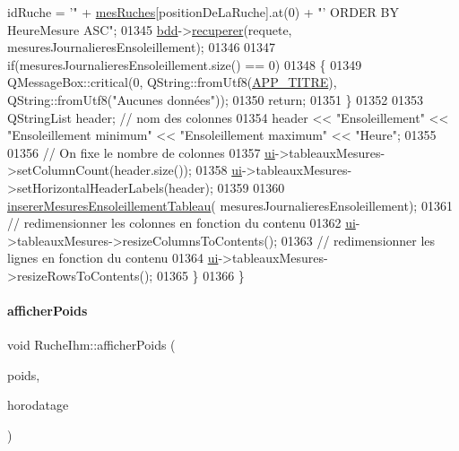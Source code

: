 \begin{DoxyCode}
{       idRuche = '"} + \hyperlink{class_ruche_ihm_ab7741fa67b19cbb2da7eb12c58cf83c1}{mesRuches}[positionDeLaRuche].at(0) + \textcolor{stringliteral}{"' ORDER BY HeureMesure ASC"};
01345         \hyperlink{class_ruche_ihm_a0851936fe212e8d40538264f09749153}{bdd}->\hyperlink{class_base_de_donnees_a77539baad389f5acf754cd2cd452403e}{recuperer}(requete, mesuresJournalieresEnsoleillement);
01346 
01347         \textcolor{keywordflow}{if}(mesuresJournalieresEnsoleillement.size() == 0)
01348         \{
01349             QMessageBox::critical(0, QString::fromUtf8(\hyperlink{parametres_8h_ace364d1ce44aa9f79bcff6e3752c4a5f}{APP\_TITRE}), QString::fromUtf8(\textcolor{stringliteral}{"Aucunes
       données"}));
01350             \textcolor{keywordflow}{return};
01351         \}
01352 
01353         QStringList header; \textcolor{comment}{// nom des colonnes}
01354         header << \textcolor{stringliteral}{"Ensoleillement"} << \textcolor{stringliteral}{"Ensoleillement minimum"} << \textcolor{stringliteral}{"Ensoleillement maximum"} << \textcolor{stringliteral}{"Heure"};
01355 
01356         \textcolor{comment}{// On fixe le nombre de colonnes}
01357         \hyperlink{class_ruche_ihm_a64786058bd7f88ca2f1e9743bb27c25b}{ui}->tableauxMesures->setColumnCount(header.size());
01358         \hyperlink{class_ruche_ihm_a64786058bd7f88ca2f1e9743bb27c25b}{ui}->tableauxMesures->setHorizontalHeaderLabels(header);
01359 
01360         \hyperlink{class_ruche_ihm_a6830ca55859cc2899ae8eb51b112557b}{insererMesuresEnsoleillementTableau}(
      mesuresJournalieresEnsoleillement);
01361         \textcolor{comment}{// redimensionner les colonnes en fonction du contenu}
01362         \hyperlink{class_ruche_ihm_a64786058bd7f88ca2f1e9743bb27c25b}{ui}->tableauxMesures->resizeColumnsToContents();
01363         \textcolor{comment}{// redimensionner les lignes en fonction du contenu}
01364         \hyperlink{class_ruche_ihm_a64786058bd7f88ca2f1e9743bb27c25b}{ui}->tableauxMesures->resizeRowsToContents();
01365     \}
01366 \}
\end{DoxyCode}
\mbox{\label{class_ruche_ihm_a840ab51f951632e630f92e6c0b5ecc4d}} 
\paragraph{\texorpdfstring{afficher\+Poids}{afficherPoids}}
{\footnotesize\ttfamily void Ruche\+Ihm\+::afficher\+Poids (\begin{DoxyParamCaption}\item[{double}]{poids,  }\item[{Q\+String}]{horodatage }\end{DoxyParamCaption})\hspace{0.3cm}{\ttfamily [slot]}}



